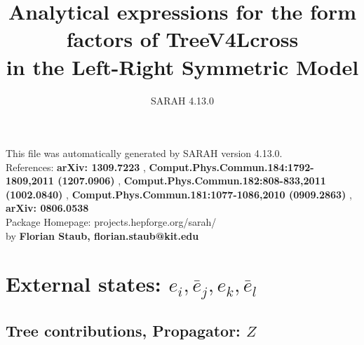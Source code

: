 \documentclass[A4,landscape]{article}
\begin{document}
\title{Analytical expressions for the form factors of TreeV4Lcross\\ in the Left-Right Symmetric Model } 
 \author{SARAH 4.13.0} 
 \maketitle 
 \vspace{10cm} 
This file was automatically generated by SARAH version 4.13.0.  \\ 
References: {\bf arXiv: 1309.7223 }, {\bf Comput.Phys.Commun.184:1792-1809,2011 (1207.0906) }, {\bf Comput.Phys.Commun.182:808-833,2011 (1002.0840) }, {\bf Comput.Phys.Commun.181:1077-1086,2010 (0909.2863) }, {\bf arXiv: 0806.0538 } \\ 
Package Homepage: projects.hepforge.org/sarah/ \\ 
by {\bf Florian Staub, florian.staub@kit.edu} 
 \pagebreak 
 \tableofcontents 
 \pagebreak 
\section{External states: ${e_{{i}}, \bar{e}_{{j}}, e_{{k}}, \bar{e}_{{l}}}$} 
\subsection{Tree contributions, Propagator: $Z$} 
\end{document}
